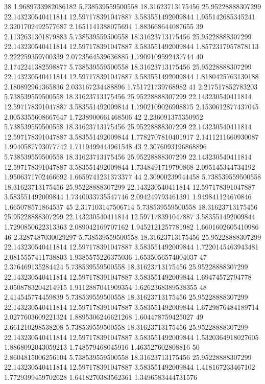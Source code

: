{38 1.9689733982086182 5.738539559500558 18.31623713175456 25.95228888307299 22.143230540411814 12.597178391047887 3.583551492009844 1.955142685345241 2.3201702492577687 2.1651141388075694 1.883668644087655
39 2.1132631301879883 5.738539559500558 18.31623713175456 25.95228888307299 22.143230540411814 12.597178391047887 3.583551492009844 1.8572317957878113 2.222259359700339 2.0723564539636885 1.7909109592437744
40 2.1742241382598877 5.738539559500558 18.31623713175456 25.95228888307299 22.143230540411814 12.597178391047887 3.583551492009844 1.8180425763130188 2.180892961365836 2.033167234488896 1.751721739768982
41 2.217517852783203 5.738539559500558 18.31623713175456 25.95228888307299 22.143230540411814 12.597178391047887 3.583551492009844 1.7902109026908875 2.1530612877437045 2.0053355608667647 1.7238900661468506
42 2.236091375350952 5.738539559500558 18.31623713175456 25.95228888307299 22.143230540411814 12.597178391047887 3.583551492009844 1.7782707810401917 2.1411211660930087 1.9940587793077742 1.7119499444961548
43 2.3076093196868896 5.738539559500558 18.31623713175456 25.95228888307299 22.143230540411814 12.597178391047887 3.583551492009844 1.7348491719790868 2.095145344734192 1.9506371702466692 1.6659741231373377
44 2.30900239944458 5.738539559500558 18.31623713175456 25.95228888307299 22.143230540411814 12.597178391047887 3.583551492009844 1.7340033735547746 2.094249793461391 1.949841124670846 1.665078571864537
45 2.317103147506714 5.738539559500558 18.31623713175456 25.95228888307299 22.143230540411814 12.597178391047887 3.583551492009844 1.7290850622313363 2.089042169707162 1.9452121257781982 1.6601602605410986
46 2.3287487030029297 5.738539559500558 18.31623713175456 25.95228888307299 22.143230540411814 12.597178391047887 3.583551492009844 1.7220145463943481 2.0815557411738803 1.9385575226375036 1.6535056574004037
47 2.376469135284424 5.738539559500558 18.31623713175456 25.95228888307299 22.143230540411814 12.597178391047887 3.583551492009844 1.69474572794778 2.0508783204214915 1.9112887041909354 1.6262368389538355
48 2.414545774459839 5.738539559500558 18.31623713175456 25.95228888307299 22.143230540411814 12.597178391047887 3.583551492009844 1.6729876484189714 2.0277603609221324 1.8895306246621268 1.604478759425027
49 2.661210298538208 5.738539559500558 18.31623713175456 25.95228888307299 22.143230540411814 12.597178391047887 3.583551492009844 1.5320364918027605 1.8868092043059213 1.748579468045916 1.463527602808816
50 2.8604815006256104 5.738539559500558 18.31623713175456 25.95228888307299 22.143230540411814 12.597178391047887 3.583551492009844 1.418167233467102 1.7729399459702628 1.6418270383562361 1.3496583444731576
}
